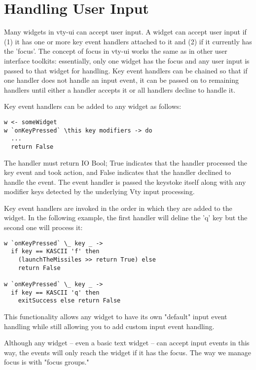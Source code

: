 \section{Handling User Input}

Many widgets in vty-ui can accept user input.  A widget can accept
user input if (1) it has one or more key event handlers attached to it
and (2) if it currently has the 'focus'.  The concept of focus in
vty-ui works the same as in other user interface toolkits:
essentially, only one widget has the focus and any user input is
passed to that widget for handling.  Key event handlers can be chained
so that if one handler does not handle an input event, it can be
passed on to remaining handlers until either a handler accepts it or
all handlers decline to handle it.

Key event handlers can be added to any widget as follows:

\begin{verbatim}
w <- someWidget
w `onKeyPressed` \this key modifiers -> do
  ...
  return False
\end{verbatim}

The handler must return IO Bool; True indicates that the handler
processed the key event and took action, and False indicates that the
handler declined to handle the event.  The event handler is passed the
keystoke itself along with any modifier keys detected by the underlying
Vty input processing.

Key event handlers are invoked in the order in which they are added to
the widget.  In the following example, the first handler will deline the
'q' key but the second one will process it:

\begin{verbatim}
w `onKeyPressed` \_ key _ ->
  if key == KASCII 'f' then
    (launchTheMissiles >> return True) else
    return False

w `onKeyPressed` \_ key _ ->
  if key == KASCII 'q' then
    exitSuccess else return False
\end{verbatim}

This functionality allows any widget to have its own "default" input
event handling while still allowing you to add custom input event
handling.

Although any widget -- even a basic text widget -- can accept input
events in this way, the events will only reach the widget if it has the
focus.  The way we manage focus is with "focus groups."
